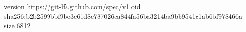 version https://git-lfs.github.com/spec/v1
oid sha256:b2b2599bbf9be3e61d8e787026ea844fa56ba3214ba9bb9541c1ab6bf978466a
size 6812

